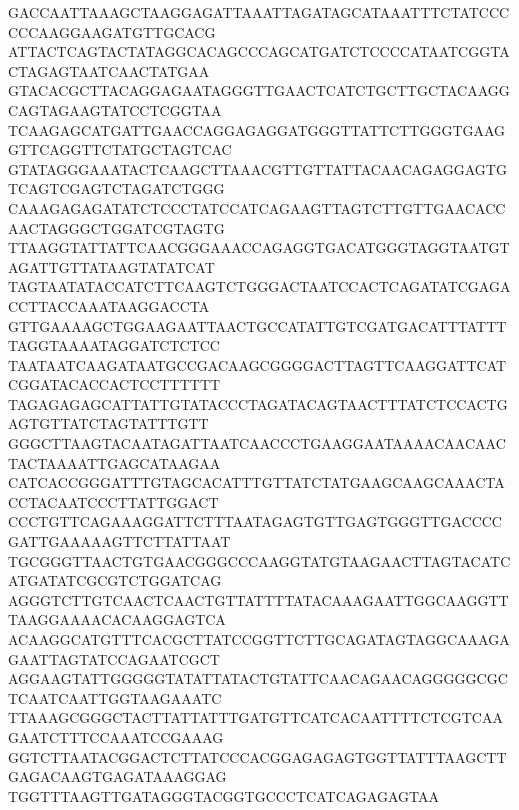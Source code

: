 GACCAATTAAAGCTAAGGAGATTAAATTAGATAGCATAAATTTCTATCCCCCCAAGGAAGATGTTGCACG
ATTACTCAGTACTATAGGCACAGCCCAGCATGATCTCCCCATAATCGGTACTAGAGTAATCAACTATGAA
GTACACGCTTACAGGAGAATAGGGTTGAACTCATCTGCTTGCTACAAGGCAGTAGAAGTATCCTCGGTAA
TCAAGAGCATGATTGAACCAGGAGAGGATGGGTTATTCTTGGGTGAAGGTTCAGGTTCTATGCTAGTCAC
GTATAGGGAAATACTCAAGCTTAAACGTTGTTATTACAACAGAGGAGTGTCAGTCGAGTCTAGATCTGGG
CAAAGAGAGATATCTCCCTATCCATCAGAAGTTAGTCTTGTTGAACACCAACTAGGGCTGGATCGTAGTG
TTAAGGTATTATTCAACGGGAAACCAGAGGTGACATGGGTAGGTAATGTAGATTGTTATAAGTATATCAT
TAGTAATATACCATCTTCAAGTCTGGGACTAATCCACTCAGATATCGAGACCTTACCAAATAAGGACCTA
GTTGAAAAGCTGGAAGAATTAACTGCCATATTGTCGATGACATTTATTTTAGGTAAAATAGGATCTCTCC
TAATAATCAAGATAATGCCGACAAGCGGGGACTTAGTTCAAGGATTCATCGGATACACCACTCCTTTTTT
TAGAGAGAGCATTATTGTATACCCTAGATACAGTAACTTTATCTCCACTGAGTGTTATCTAGTATTTGTT
GGGCTTAAGTACAATAGATTAATCAACCCTGAAGGAATAAAACAACAACTACTAAAATTGAGCATAAGAA
CATCACCGGGATTTGTAGCACATTTGTTATCTATGAAGCAAGCAAACTACCTACAATCCCTTATTGGACT
CCCTGTTCAGAAAGGATTCTTTAATAGAGTGTTGAGTGGGTTGACCCCGATTGAAAAAGTTCTTATTAAT
TGCGGGTTAACTGTGAACGGGCCCAAGGTATGTAAGAACTTAGTACATCATGATATCGCGTCTGGATCAG
AGGGTCTTGTCAACTCAACTGTTATTTTATACAAAGAATTGGCAAGGTTTAAGGAAAACACAAGGAGTCA
ACAAGGCATGTTTCACGCTTATCCGGTTCTTGCAGATAGTAGGCAAAGAGAATTAGTATCCAGAATCGCT
AGGAAGTATTGGGGGTATATTATACTGTATTCAACAGAACAGGGGGCGCTCAATCAATTGGTAAGAAATC
TTAAAGCGGGCTACTTATTATTTGATGTTCATCACAATTTTCTCGTCAAGAATCTTTCCAAATCCGAAAG
GGTCTTAATACGGACTCTTATCCCACGGAGAGAGTGGTTATTTAAGCTTGAGACAAGTGAGATAAAGGAG
TGGTTTAAGTTGATAGGGTACGGTGCCCTCATCAGAGAGTAA


